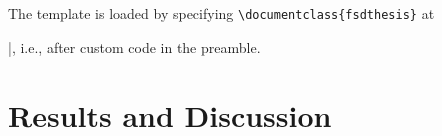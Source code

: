 The template is loaded by specifying \lstinline|\documentclass{fsdthesis}| at
\begin{document}
|, i.e., after custom
code in the preamble.



\section{Results and Discussion}

\Blindtext[4][2]
\end{document}
